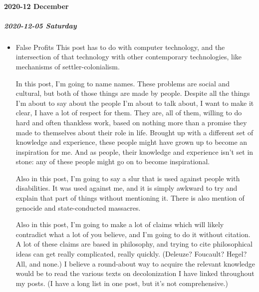 \documentclass[11pt]{article}
\begin{document}
\paragraph*{2020-12 December}
\label{sec:org94b4bf4}
\startcontents[level-4]
\subparagraph*{2020-12-05 Saturday}
\label{sec:orgd63613f}
\begin{itemize}
\item False Profits
\label{sec:org956e196}
This post has to do with computer technology, and the intersection of that technology with other contemporary technologies, like mechanisms of settler-colonialism.

In this post, I’m going to name names. These problems are social and cultural, but both of those things are made by people. Despite all the things I’m about to say about the people I’m about to talk about, I want to make it clear, I have a lot of respect for them. They are, all of them, willing to do hard and often thankless work, based on nothing more than a promise they made to themselves about their role in life. Brought up with a different set of knowledge and experience, these people might have grown up to become an inspiration for me. And as people, their knowledge and experience isn’t set in stone: any of these people might go on to become inspirational.

Also in this post, I’m going to say a slur that is used against people with disabilities. It was used against me, and it is simply awkward to try and explain that part of things without mentioning it. There is also mention of genocide and state-conducted massacres.

Also in this post, I’m going to make a lot of claims which will likely contradict what a lot of you believe, and I’m going to do it without citation. A lot of these claims are based in philosophy, and trying to cite philosophical ideas can get really complicated, really quickly. (Deleuze? Foucault? Hegel? All, and none.) I believe a round-about way to acquire the relevant knowledge would be to read the various texts on decolonization I have linked throughout my posts. (I have a long list in one post, but it’s not comprehensive.)


\end{itemize}
\end{document}
